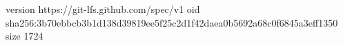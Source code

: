 version https://git-lfs.github.com/spec/v1
oid sha256:3b70ebbcb3b1d138d39819ee5f25c2d1f42daea0b5692a68c0f6845a3eff1350
size 1724
